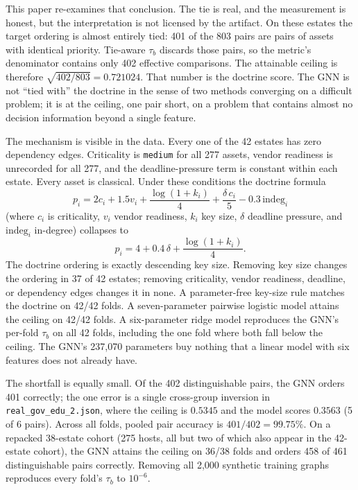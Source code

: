 \documentclass[conference,10pt]{IEEEtran}
\newcommand{\tb}{\tau_b}
\begin{document}
This paper re-examines that conclusion. The tie is real, and the measurement is honest, but the
interpretation is not licensed by the artifact. On these estates the target ordering is almost
entirely tied: 401 of the 803 pairs are pairs of assets with identical priority. Tie-aware
$\tb$ discards those pairs, so the metric's denominator contains only 402 effective
comparisons. The attainable ceiling is therefore $\sqrt{402/803}=0.721024$. That number is the
doctrine score. The GNN is not ``tied with'' the doctrine in the sense of two methods
converging on a difficult problem; it is at the ceiling, one pair short, on a problem that
contains almost no decision information beyond a single feature.

The mechanism is visible in the data. Every one of the 42 estates has zero dependency edges.
Criticality is \texttt{medium} for all 277 assets, vendor readiness is unrecorded for all 277,
and the deadline-pressure term is constant within each estate. Every asset is classical. Under
these conditions the doctrine formula
\begin{equation}
p_i = 2c_i + 1.5v_i + \frac{\log(1+k_i)}{4}
      + \frac{\delta\,c_i}{5} - 0.3\,\mathrm{indeg}_i
\label{eq:doctrine}
\end{equation}
(where $c_i$ is criticality, $v_i$ vendor readiness, $k_i$ key size, $\delta$ deadline pressure,
and $\mathrm{indeg}_i$ in-degree) collapses to
\begin{equation}
p_i = 4 + 0.4\,\delta + \frac{\log(1+k_i)}{4}.
\label{eq:collapse}
\end{equation}
The doctrine ordering is exactly descending key size. Removing key size changes the ordering in
37 of 42 estates; removing criticality, vendor readiness, deadline, or dependency edges changes
it in none. A parameter-free key-size rule matches the doctrine on 42/42 folds. A seven-parameter
pairwise logistic model attains the ceiling on 42/42 folds. A six-parameter ridge model
reproduces the GNN's per-fold $\tb$ on all 42 folds, including the one fold where both fall
below the ceiling. The GNN's 237{,}070 parameters buy nothing that a linear model with six
features does not already have.

The shortfall is equally small. Of the 402 distinguishable pairs, the GNN orders 401 correctly;
the one error is a single cross-group inversion in \texttt{real\_gov\_edu\_2.json}, where the
ceiling is $0.5345$ and the model scores $0.3563$ (5 of 6 pairs). Across all folds, pooled pair
accuracy is $401/402=99.75\%$. On a repacked 38-estate cohort (275 hosts, all but two of which
also appear in the 42-estate cohort), the GNN attains the ceiling on 36/38 folds and orders 458
of 461 distinguishable pairs correctly. Removing all 2,000 synthetic training graphs reproduces
every fold's $\tb$ to $10^{-6}$.
\end{document}
